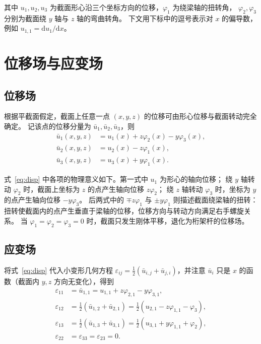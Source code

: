 \documentclass[UTF8,a4paper,11pt]{ctexart}
\newcommand{\ud}{\mathrm{d}}
\begin{document}
其中 $u_1,u_2,u_3$ 为截面形心沿三个坐标方向的位移，$\varphi_1$ 为绕梁轴的扭转角，
$\varphi_2,\varphi_3$ 分别为截面绕 $y$ 轴与 $z$ 轴的弯曲转角。
下文用下标中的逗号表示对 $x$ 的偏导数，例如 $u_{1,1}=\ud u_1/\ud x$。

\section{位移场与应变场}

\subsection{位移场}

根据平截面假定，截面上任意一点 $(x,y,z)$ 的位移可由形心位移与截面转动完全确定。
记该点的位移分量为 $\bar u_1,\bar u_2,\bar u_3$，则
\begin{equation}\label{eq:disp}
\boxed{
\begin{aligned}
\bar u_1(x,y,z) &= u_1(x)+z\varphi_2(x)-y\varphi_3(x),\\
\bar u_2(x,y,z) &= u_2(x)-z\varphi_1(x),\\
\bar u_3(x,y,z) &= u_3(x)+y\varphi_1(x).
\end{aligned}}
\end{equation}

式~\eqref{eq:disp} 中各项的物理意义如下。第一式中 $u_1$ 为形心的轴向位移；
绕 $y$ 轴转动 $\varphi_2$ 时，截面上坐标为 $z$ 的点产生轴向位移 $z\varphi_2$；
绕 $z$ 轴转动 $\varphi_3$ 时，坐标为 $y$ 的点产生轴向位移 $-y\varphi_3$。
后两式中的 $\mp z\varphi_1$ 与 $\pm y\varphi_1$ 则描述截面绕梁轴的扭转：
扭转使截面内的点产生垂直于梁轴的位移，位移方向与转动方向满足右手螺旋关系。
当 $\varphi_1=\varphi_2=\varphi_3=0$ 时，截面只发生刚体平移，退化为桁架杆的位移场。

\subsection{应变场}

将式~\eqref{eq:disp} 代入小变形几何方程
$\varepsilon_{ij}=\tfrac12(\bar u_{i,j}+\bar u_{j,i})$，并注意
$\bar u_i$ 只是 $x$ 的函数（截面内 $y,z$ 方向无变化），得到
\begin{equation}\label{eq:strain}
\boxed{
\begin{aligned}
\varepsilon_{11} &= \bar u_{1,1}=u_{1,1}+z\varphi_{2,1}-y\varphi_{3,1},\\
\varepsilon_{12} &= \tfrac12\left(\bar u_{1,2}+\bar u_{2,1}\right)
                 = \tfrac12\left(u_{2,1}-z\varphi_{1,1}-\varphi_3\right),\\
\varepsilon_{13} &= \tfrac12\left(\bar u_{1,3}+\bar u_{3,1}\right)
                 = \tfrac12\left(u_{3,1}+y\varphi_{1,1}+\varphi_2\right),\\
\varepsilon_{22} &= \varepsilon_{33}=\varepsilon_{23}=0.
\end{aligned}}
\end{equation}
\end{document}
